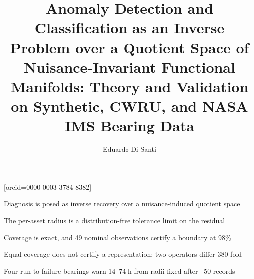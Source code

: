 \documentclass[a4paper]{cas-sc}
\begin{document}

\title{Anomaly Detection and Classification as an Inverse Problem over a
Quotient Space of Nuisance-Invariant Functional Manifolds:
Theory and Validation on Synthetic, CWRU, and NASA IMS Bearing Data}

\author[1]{Eduardo Di Santi}[orcid=0000-0003-3784-8382]
\cormark[1]

\address[1]{Department of Applied Mathematics,
University of Colorado Boulder, Boulder, CO, USA}


\begin{highlights}
\item Diagnosis is posed as inverse recovery over a nuisance-induced quotient space
\item The per-asset radius is a distribution-free tolerance limit on the residual
\item Coverage is exact, and 49 nominal observations certify a boundary at 98\%
\item Equal coverage does not certify a representation: two operators differ 380-fold
\item Four run-to-failure bearings warn 14--74 h from radii fixed after ~50 records
\end{highlights}
\end{document}
